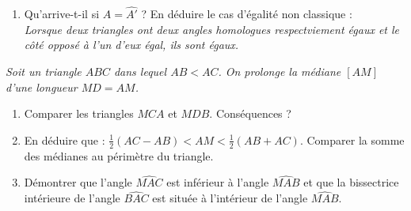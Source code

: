 \begin{itemize}
\begin{enumerate}
\item Qu'arrive-t-il si $\widehat{A}=\widehat{A'}$ ? En déduire le cas d'égalité non classique : \\
\emph{Lorsque deux triangles ont deux angles homologues respectviement égaux et le côté opposé à l'un d'eux égal, ils sont égaux.}
\end{enumerate}
\it Soit un triangle $ABC$ dans lequel $AB<AC$. On prolonge la médiane $[AM]$ d'une longueur $MD=AM$.
\begin{enumerate}
\item Comparer les triangles $MCA$ et $MDB$. Conséquences ?
\item En déduire que : $\frac12(AC-AB)<AM<\frac12(AB+AC)$. Comparer la somme des médianes au périmètre du triangle.
\item Démontrer que l'angle $\widehat{MAC}$ est inférieur à l'angle $\widehat{MAB}$ et que la bissectrice intérieure de l'angle $\widehat{BAC}$ est située à l'intérieur de l'angle $\widehat{MAB}$.
\end{enumerate}
\end{itemize}
